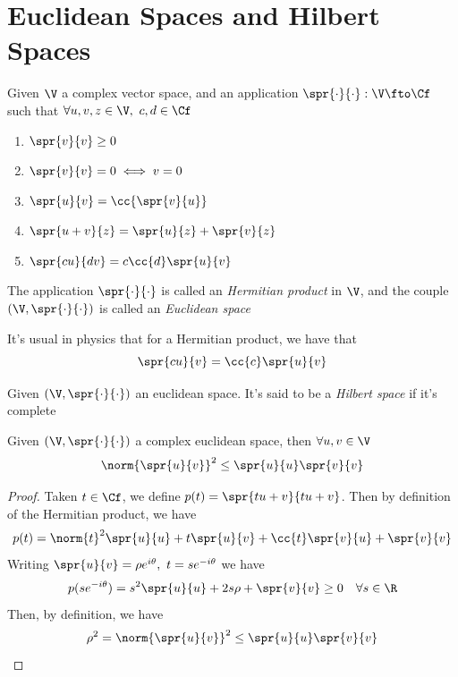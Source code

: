 \documentclass[../mmf.tex]{subfiles}
\begin{document}
\section{Euclidean Spaces and Hilbert Spaces}
\begin{dfn}
	Given $\V$ a complex vector space, and an application $\spr{\cdot}{\cdot}:\V\fto\Cf$ such that $\forall u,v,z\in\V,\ c,d\in\Cf$
	\begin{enumerate}
	\item $\spr{v}{v}\ge0$
	\item $\spr{v}{v}=0\iff v=0$
	\item $\spr{u}{v}=\cc{\spr{v}{u}}$
	\item $\spr{u+v}{z}=\spr{u}{z}+\spr{v}{z}$
	\item $\spr{cu}{dv}=c\cc{d}\spr{u}{v}$
	\end{enumerate}
	The application $\spr{\cdot}{\cdot}$ is called an \textit{Hermitian product} in $\V$, and the couple $(\V,\spr{\cdot}{\cdot})$ is called an \textit{Euclidean space}
\end{dfn}
\begin{rmk}
	It's usual in physics that for a Hermitian product, we have that
	\begin{equation}
		\spr{cu}{v}=\cc{c}\spr{u}{v}
		\label{eq:physicshermprod}
	\end{equation}
\end{rmk}
\begin{dfn}
	Given $(\V,\spr{\cdot}{\cdot})$ an euclidean space. It's said to be a \textit{Hilbert space} if it's complete
\end{dfn}
\begin{thm}
	Given $(\V,\spr{\cdot}{\cdot})$ a complex euclidean space, then $\forall u,v\in\V$
	\begin{equation}
		\norm{\spr{u}{v}}^2\le\spr{u}{u}\spr{v}{v}
		\label{eq:cauchyschwartzineq}
	\end{equation}
\end{thm}
\begin{proof}
	Taken $t\in\Cf$, we define $p(t)=\spr{tu+v}{tu+v}$. Then by definition of the Hermitian product, we have
	\begin{equation*}
		p(t)=\norm{t}^2\spr{u}{u}+t\spr{u}{v}+\cc{t}\spr{v}{u}+\spr{v}{v}
	\end{equation*}
	Writing $\spr{u}{v}=\rho e^{i\theta},\ t=se^{-i\theta}$ we have
	\begin{equation*}
		p(se^{-i\theta})=s^2\spr{u}{u}+2s\rho+\spr{v}{v}\ge0\quad\forall s\in\R
	\end{equation*}
	Then, by definition, we have
	\begin{equation*}
		\rho^2=\norm{\spr{u}{v}}^2\le\spr{u}{u}\spr{v}{v}
	\end{equation*}
\end{proof}
\end{document}
